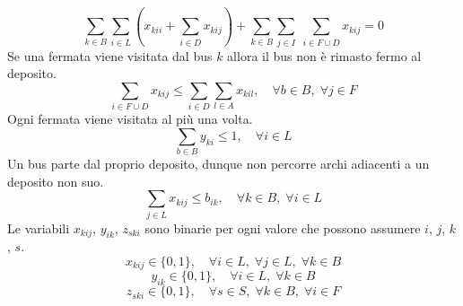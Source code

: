 \begin{equation}
    \sum_{k \in B}\sum_{i \in L}(x_{kii} + \sum_{i \in D}x_{kij}) + \sum_{k \in B}\sum_{j \in I}\;\sum_{i \in F \cup D}x_{kij} = 0
\end{equation}
Se una fermata viene visitata dal bus $k$ allora il bus non è rimasto fermo al deposito.
\begin{equation}
    \sum_{i \in F \cup D}x_{kij} \leq \sum_{i \in D}\sum_{l \in A}x_{kil}, \quad \forall b \in B,\;\forall j \in F
\end{equation}
Ogni fermata viene visitata al più una volta.
\begin{equation}
    \sum_{b \in B}y_{ki} \leq 1, \quad \forall i \in L
\end{equation}
Un bus parte dal proprio deposito, dunque non percorre archi adiacenti a un deposito non suo.
\begin{equation}
    \sum_{j \in L}x_{kij} \leq b_{ik}, \quad \forall k \in B,\;\forall i \in L
\end{equation}
Le variabili $x_{kij}$, $y_{ik}$, $z_{ski}$ sono binarie per ogni valore che possono assumere $i$, $j$, $k$, $s$.
\begin{equation}
    x_{kij} \in \{0,1\},\quad \forall i \in L,\;\forall j \in L,\;\forall k \in B
\end{equation}
\begin{equation}
    y_{ik} \in \{0,1\},\quad \forall i \in L,\;\forall k \in B
\end{equation}
\begin{equation}
    z_{ski} \in \{0,1\},\quad \forall s \in S,\;\forall k \in B,\;\forall i \in F
\end{equation}

